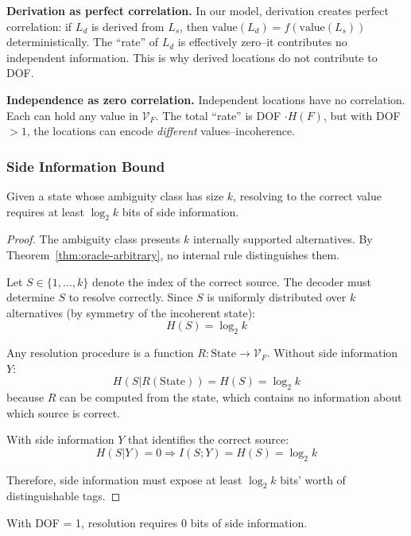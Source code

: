 \textbf{Derivation as perfect correlation.} In our model, derivation creates perfect correlation: if $L_d$ is derived from $L_s$, then $\text{value}(L_d) = f(\text{value}(L_s))$ deterministically. The ``rate'' of $L_d$ is effectively zero--it contributes no independent information. This is why derived locations do not contribute to DOF.

\textbf{Independence as zero correlation.} Independent locations have no correlation. Each can hold any value in $\mathcal{V}_F$. The total ``rate'' is DOF $\cdot H(F)$, but with DOF $> 1$, the locations can encode \emph{different} values--incoherence.

\subsubsection{Side Information Bound}

\begin{theorem}\label{thm:side-info}
Given a state whose ambiguity class has size $k$, resolving to the correct value requires at least $\log_2 k$ bits of side information.
\end{theorem}

\begin{proof}
The ambiguity class presents $k$ internally supported alternatives. By Theorem~\ref{thm:oracle-arbitrary}, no internal rule distinguishes them.

Let $S \in \{1, \ldots, k\}$ denote the index of the correct source. The decoder must determine $S$ to resolve correctly. Since $S$ is uniformly distributed over $k$ alternatives (by symmetry of the incoherent state):
\[
H(S) = \log_2 k
\]

Any resolution procedure is a function $R: \text{State} \to \mathcal{V}_F$. Without side information $Y$:
\[
H(S | R(\text{State})) = H(S) = \log_2 k
\]
because $R$ can be computed from the state, which contains no information about which source is correct.

With side information $Y$ that identifies the correct source:
\[
H(S | Y) = 0 \Rightarrow I(S; Y) = H(S) = \log_2 k
\]

Therefore, side information must expose at least $\log_2 k$ bits' worth of distinguishable tags.
\end{proof}

\begin{corollary}[DOF = 1 Requires Zero Side Information]\label{cor:dof1-zero-side}
With DOF = 1, resolution requires 0 bits of side information.
\end{corollary}


